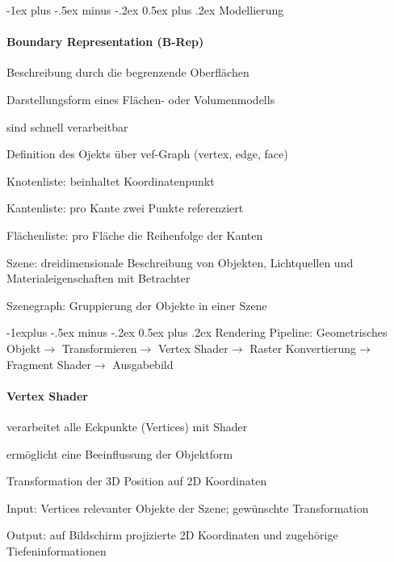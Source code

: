 \documentclass[landscape]{article}
\makeatletter
\renewcommand{\section}{\@startsection{section}{1}{0mm}%
                                {-1ex plus -.5ex minus -.2ex}%
                                {0.5ex plus .2ex}%
                                {\normalfont\large\bfseries}}
\renewcommand{\subsection}{\@startsection{subsection}{2}{0mm}%
                                {-1explus -.5ex minus -.2ex}%
                                {0.5ex plus .2ex}%
                                {\normalfont\normalsize\bfseries}}
\makeatother
\begin{document}
\begin{multicols}{3}
  \newpage
  \section{Modellierung}
  
  \paragraph{Boundary Representation (B-Rep)}
  \begin{itemize*}
    \item Beschreibung durch die begrenzende Oberflächen
    \item Darstellungsform eines Flächen- oder Volumenmodells
    \item sind schnell verarbeitbar
    \item Definition des Ojekts über vef-Graph (vertex, edge, face)
    \begin{itemize*}
      \item Knotenliste: beinhaltet Koordinatenpunkt
      \item Kantenliste: pro Kante zwei Punkte referenziert
      \item Flächenliste: pro Fläche die Reihenfolge der Kanten
    \end{itemize*}
    \item Szene: dreidimensionale Beschreibung von Objekten, Lichtquellen und Materialeigenschaften mit Betrachter
    \item Szenegraph: Gruppierung der Objekte in einer Szene
  \end{itemize*}
  
  \subsection{Rendering}
  Pipeline: Geometrisches Objekt$\rightarrow$ Transformieren$\rightarrow$ Vertex Shader$\rightarrow$ Raster Konvertierung$\rightarrow$ Fragment Shader$\rightarrow$ Ausgabebild
  
  \paragraph{Vertex Shader}
  \begin{itemize*}
    \item verarbeitet alle Eckpunkte (Vertices) mit Shader
    \item ermöglicht eine Beeinflussung der Objektform
    \item Transformation der 3D Position auf 2D Koordinaten
    \item Input: Vertices relevanter Objekte der Szene; gewünschte Transformation
    \item Output: auf Bildschirm projizierte 2D Koordinaten und zugehörige Tiefeninformationen
  \end{itemize*}
  

\end{multicols}
\end{document}
